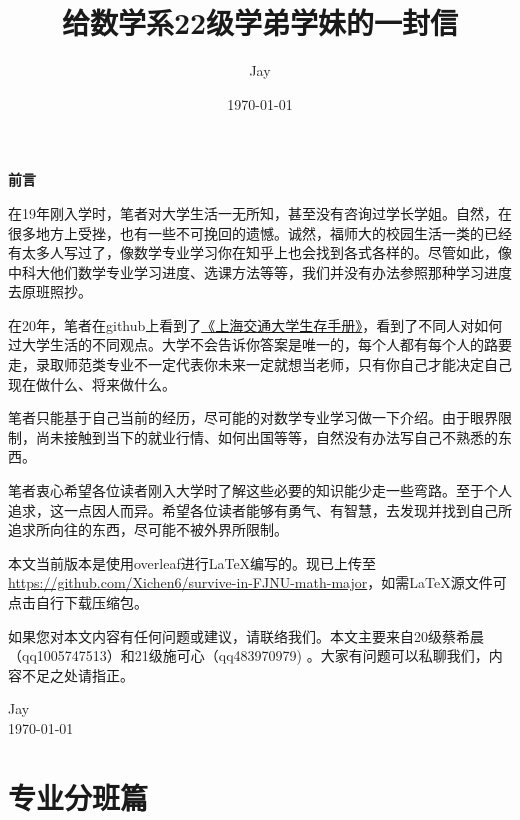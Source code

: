 \documentclass{my_paper}
\title{给数学系22级学弟学妹的一封信}
\author{Jay }
\date{\today}
\begin{document}
\maketitle
\thispagestyle{empty}

\newpage

\begin{center}
	\textbf{\LARGE 前言}
\end{center}

在19年刚入学时，笔者对大学生活一无所知，甚至没有咨询过学长学姐。自然，在很多地方上受挫，也有一些不可挽回的遗憾。诚然，福师大的校园生活一类的已经有太多人写过了，像数学专业学习你在知乎上也会找到各式各样的。尽管如此，像中科大他们数学专业学习进度、选课方法等等，我们并没有办法参照那种学习进度去原班照抄。

在20年，笔者在github上看到了\href{https://survivesjtu.gitbook.io/survivesjtumanual/}{《上海交通大学生存手册》}，看到了不同人对如何过大学生活的不同观点。大学不会告诉你答案是唯一的，每个人都有每个人的路要走，录取师范类专业不一定代表你未来一定就想当老师，只有你自己才能决定自己现在做什么、将来做什么。

笔者只能基于自己当前的经历，尽可能的对数学专业学习做一下介绍。由于眼界限制，尚未接触到当下的就业行情、如何出国等等，自然没有办法写自己不熟悉的东西。

笔者衷心希望各位读者刚入大学时了解这些必要的知识能少走一些弯路。至于个人追求，这一点因人而异。希望各位读者能够有勇气、有智慧，去发现并找到自己所追求所向往的东西，尽可能不被外界所限制。

本文当前版本是使用overleaf进行\LaTeX{}编写的。现已上传至\href{https://github.com/Xichen6/survive-in-FJNU-math-major}{https://github.com/Xichen6/survive-in-FJNU-math-major}，如需\LaTeX{}源文件可点击自行下载压缩包。

如果您对本文内容有任何问题或建议，请联络我们。本文主要来自20级蔡希晨（qq1005747513）和21级施可心（qq483970979) 。大家有问题可以私聊我们，内容不足之处请指正。


\begin{flushright}
	Jay \\
	\today
\end{flushright}




\newpage


\tableofcontents

\thispagestyle{empty}
\newpage

\setcounter{page}{1}
\section{专业分班篇}
\end{document}
